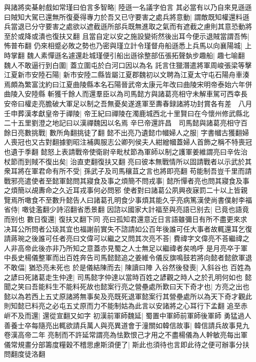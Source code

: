 與諸將奕棊射戲如常瑾曰伯言多智略|{
	陸遜一名議字伯言}
其必當有以乃自來見遜遜曰賊知大駕已還無所復憂得專力於吾又已守要害之處兵將意動|{
	謂敵既知權還料遜兵當退已分守要害之處欲以遮截遜所部兵既無進取之氣而有遮截之慮則其意恐動將至於或降或潰也復扶又翻}
且當自定以安之施設變術然後出耳今便示退賊當謂吾怖|{
	怖普布翻}
仍來相蹙必敗之勢也乃密與瑾立計令瑾督舟船遜悉上兵馬以向襄陽城|{
	上時掌翻}
魏人素憚遜名遽還赴城瑾便引船出遜徐整部伍張拓聲埶步趣船|{
	趣七喻翻}
魏人不敢逼行到白圍|{
	蓋立圍屯於白河口因以為名}
託言住獵潛遣將軍周峻張梁等擊江夏新市安陸石陽|{
	新市安陸二縣皆屬江夏郡魏初以文聘為江夏太守屯石陽舟車湊焉頗為繁富沈約曰江夏曲陵縣本名石陽晉武帝太康元年改曰曲陵宋明帝泰始六年併曲陵入安陸縣}
斬獲千餘人而還羣臣以為司馬懿方與諸葛亮相守未解車駕可西幸長安帝曰權走亮膽破大軍足以制之吾無憂矣遂進軍至夀春録諸將功封賞各有差　八月壬申葬漢孝獻皇帝于禪陵|{
	帝王紀曰禪陵在濁鹿城西北十里賢曰在今懷州修武縣北二十五里劉澄之地記曰以漢禪魏因以名焉}
辛巳帝還許昌　司馬懿與諸葛亮相守百餘日亮數挑戰|{
	數所角翻挑徒了翻}
懿不出亮乃遺懿巾幗婦人之服|{
	字書幗古獲翻婦人喪冠也又古對翻據劉昭注補輿服志公卿列侯夫人紺繒幗蓋婦人首飾之稱不特喪冠也遺于季翻}
懿怒上表請戰帝使衛尉辛毗杖節為軍師以制之護軍姜維謂亮曰辛佐治杖節而到賊不復出矣|{
	治直吏翻復扶又翻}
亮曰彼本無戰情所以固請戰者以示武於其衆耳將在軍君命有所不受|{
	孫武子及司馬穰苴之言也將即亮翻}
苟能制吾豈千里而請戰邪亮遣使者至懿軍懿問其寢食及事之煩簡不問戎事|{
	懿所憚者亮也問其寢食及事之煩簡以覘夀命之久近耳戎事何必問邪}
使者對曰諸葛公夙興夜寐罰二十以上皆親覽焉所噉食不至數升懿告人曰諸葛孔明食少事煩其能久乎亮病篤漢使尚書僕射李福省侍|{
	噉徒濫翻少詩沼翻省悉景翻}
因諮以國家大計福至與亮語已别去|{
	已竟也語竟而别也}
數日復還|{
	復扶又翻下同}
亮曰孤知君還意近日言語雖彌日有所不盡更來求决耳公所問者公琰其宜也福謝前實失不諮請如公百年後誰可任大事者故輒還耳乞復請蔣琬之後誰可任者亮曰文偉可以繼之又問其次亮不荅|{
	費禕字文偉亮不荅繼禕之人非高帝此後亦非乃所知之意蓋亦見蜀之人士無足以繼禕者矣嗚呼}
是月亮卒于軍中長史楊儀整軍而出百姓奔告司馬懿懿追之姜維令儀反旗鳴鼓若將向懿者懿歛軍退不敢偪|{
	猶恐亮未死也}
於是儀結陳而去|{
	陳讀曰陣}
入谷然後發喪|{
	入斜谷也}
百姓為之諺曰死諸葛走生仲達|{
	司馬懿字仲達以當時百姓之諺觀之時人之於孔明何如也}
懿聞之笑曰吾能料生不能料死故也懿案行亮之營壘處所歎曰天下奇才也|{
	方亮之出也懿以為若西上五丈原諸將無事矣及亮既死退軍懿案行其營壘處所以為天下奇才觀此則知懿已料亮之必屯五丈原而力不能制姑為此言以安諸將之心耳行下孟翻}
追至赤㟁不及而還|{
	還從宣翻又如字}
初漢前軍師魏延|{
	蜀置中軍師前軍師後軍師}
勇猛過人善養士卒每隨亮出輒欲請兵萬人與亮異道會于潼關如韓信故事|{
	韓信請兵故事見九卷漢高帝二年}
亮制而不許延常謂亮為怯歎恨己才用之不盡楊儀為人幹敏亮每出軍儀常規畫分部籌度糧穀不稽思慮斯須便了|{
	斯此也須待也言即此待之便可辦事分扶問翻度徒洛翻}
